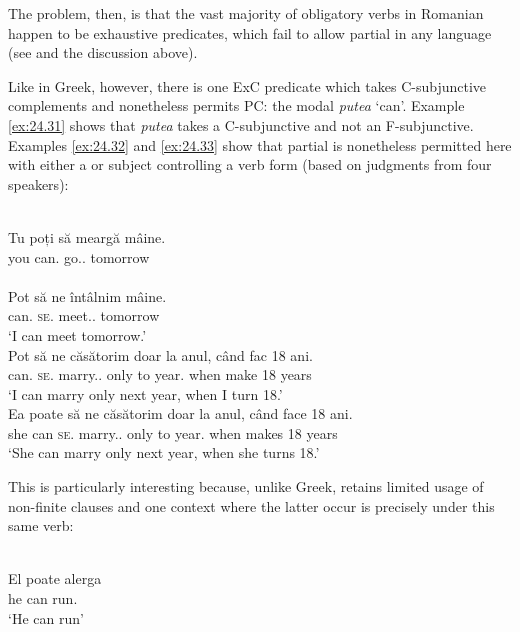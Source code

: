 \documentclass[output=paper]{langsci/langscibook}
\begin{document}
The problem, then, is that the vast majority of obligatory  verbs in
Romanian happen to be exhaustive  predicates, which fail to allow
partial  in any language (see \citealt{Landau2000,Landau2004,Landau2015}
and the discussion above).

Like in Greek, however, there is one \gls{ExC}
predicate which takes C-subjunctive complements and nonetheless permits PC: the
modal \emph{putea} ‘can’. Example \eqref{ex:24.31} shows that \emph{putea} takes a
C-subjunctive and not an F-subjunctive. Examples \eqref{ex:24.32} and \eqref{ex:24.33} show that
partial  is nonetheless permitted here with either a \Fsg{} or \Tsg{}
subject controlling a \Fpl{} verb form (based on judgments from four speakers):

\ea%
    \label{ex:24.31} \\
	\gll \llap{*}Tu   poți   să   meargă   mâine.\\
    you   can.\Ssg{}   \Sbjv{}   go.\Sbjv{}.\Third{} tomorrow\\
    \glt
\ex%
    \label{ex:24.32} \\
	\gll Pot   să   ne     întâlnim     mâine.\\
    can.\Fsg{}  \Sbjv{}  \textsc{se}.\Fpl{}  meet.\Sbjv{}.\Fpl{}  tomorrow\\
	\glt ‘I can meet tomorrow.’
\ex%
    \label{ex:24.33} \\
	\gll Pot   să   ne    căsătorim         doar la anul,      când fac      18 ani.\\
    can.\Fsg{}  \Sbjv{}  \textsc{se}.\Fpl{} marry.\Sbjv{}.\Fpl{} only to year.\Def{} when make 18 years\\
	\glt ‘I can marry only next year, when I turn 18.’
\ex%
    \label{ex:24.34} \\
	\gll Ea  poate   să   ne   căsătorim         doar la anul,      când face   18 ani.\\
    she can   \Sbjv{}   \textsc{se}.\Fpl{} marry.\Sbjv{}.\Fpl{} only  to year.\Def{}      when makes   18 years\\
	\glt ‘She can marry only next year, when she turns 18.’
\z

This is particularly interesting because, unlike Greek,  retains
limited usage of non-finite clauses and one context where the latter occur is
precisely under this same verb:

\ea%
    \label{ex:24.35}  \citep[136]{PanaDindelegan2013}\\
	\gll El poate alerga\\
		he can run.\Inf{}\\
	\glt ‘He can run’
\z
\end{document}
